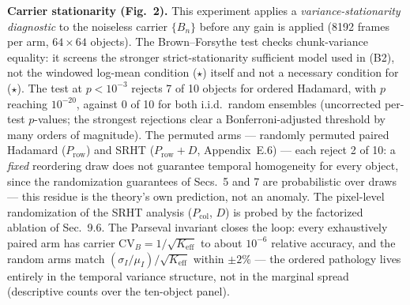\noindent\textbf{Carrier stationarity (Fig.~2).} This experiment applies a \emph{variance-stationarity diagnostic} to the noiseless carrier $\{B_n\}$ before any gain is applied (8192 frames per arm, $64\times64$ objects). The Brown--Forsythe test checks chunk-variance equality: it screens the stronger strict-stationarity sufficient model used in (B2), not the windowed log-mean condition ($\star$) itself and not a necessary condition for ($\star$). The test at $p<10^{-3}$ rejects 7 of 10 objects for ordered Hadamard, with $p$ reaching $10^{-20}$, against 0 of 10 for both i.i.d.\ random ensembles (uncorrected per-test $p$-values; the strongest rejections clear a Bonferroni-adjusted threshold by many orders of magnitude). The permuted arms --- randomly permuted paired Hadamard ($P_{\mathrm{row}}$) and SRHT ($P_{\mathrm{row}}{+}D$, Appendix~E.6) --- each reject 2 of 10: a \emph{fixed} reordering draw does not guarantee temporal homogeneity for every object, since the randomization guarantees of Secs.~5 and 7 are probabilistic over draws --- this residue is the theory's own prediction, not an anomaly. The pixel-level randomization of the SRHT analysis ($P_{\mathrm{col}}$, $D$) is probed by the factorized ablation of Sec.~9.6. The Parseval invariant closes the loop: every exhaustively paired arm has carrier $\mathrm{CV}_B = 1/\sqrt{K_{\mathrm{eff}}}$ to about $10^{-6}$ relative accuracy, and the random arms match $(\sigma_I/\mu_I)/\sqrt{K_{\mathrm{eff}}}$ within $\pm2\%$ --- the ordered pathology lives entirely in the temporal variance structure, not in the marginal spread (descriptive counts over the ten-object panel).

